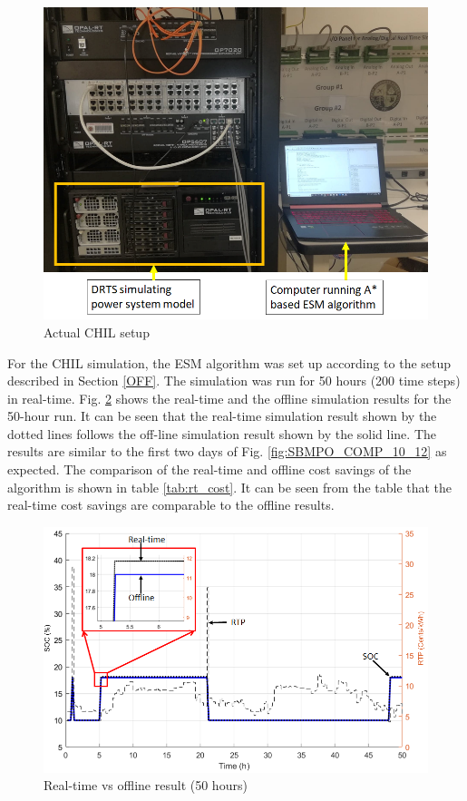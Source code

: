 \begin{figure}[!ht]
    \centering
    \includegraphics[width = 0.5\linewidth]{figs/A8/LAB_REAL.png}
    \caption{Actual CHIL setup}
    \label{fig:LAB_REAL}
\end{figure}

For the CHIL simulation, the ESM algorithm was set up according to the setup described in Section \ref{OFF}. The simulation was run for 50 hours (200 time steps) in real-time. Fig. \ref{fig:RT_TESTING} shows the real-time and the offline simulation results for the 50-hour run. It can be seen that the real-time simulation result shown by the dotted lines follows the off-line simulation result shown by the solid line. The results are similar to the first two days of Fig. \ref{fig:SBMPO_COMP_10_12} as expected. The comparison of the real-time and offline cost savings of the algorithm is shown in table \ref{tab:rt_cost}. It can be seen from the table that the real-time cost savings are comparable to the offline results.

\begin{figure}[!ht]
    \centering
    \includegraphics[width = 0.5\linewidth]{figs/A8/RT_TESTING.png}
    \caption{Real-time vs offline result (50  hours)}
    \label{fig:RT_TESTING}
\end{figure}

